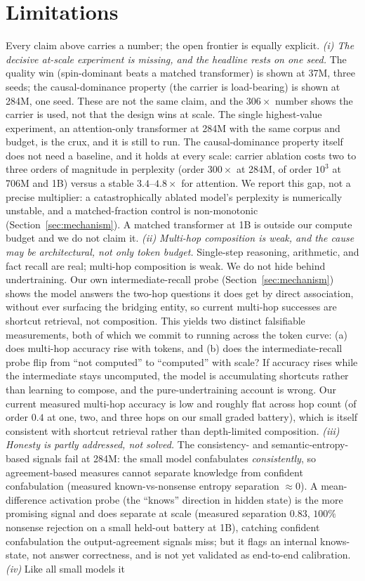 \documentclass[journal]{IEEEtran}
\begin{document}
\section{Limitations}
\label{sec:limitations}
Every claim above carries a number; the open frontier is equally explicit. \emph{(i) The decisive at-scale experiment is missing, and the headline rests on one seed.} The quality win (spin-dominant beats a matched transformer) is shown at 37M, three seeds; the causal-dominance property (the carrier is load-bearing) is shown at 284M, one seed. These are not the same claim, and the $306\times$ number shows the carrier is used, not that the design wins at scale. The single highest-value experiment, an attention-only transformer at 284M with the same corpus and budget, is the crux, and it is still to run. The causal-dominance property itself does not need a baseline, and it holds at every scale: carrier ablation costs two to three orders of magnitude in perplexity (order $300\times$ at 284M, of order $10^3$ at 706M and 1B) versus a stable $3.4$--$4.8\times$ for attention. We report this gap, not a precise multiplier: a catastrophically ablated model's perplexity is numerically unstable, and a matched-fraction control is non-monotonic (Section~\ref{sec:mechanism}). A matched transformer at 1B is outside our compute budget and we do not claim it. \emph{(ii) Multi-hop composition is weak, and the cause may be architectural, not only token budget.} Single-step reasoning, arithmetic, and fact recall are real; multi-hop composition is weak. We do not hide behind undertraining. Our own intermediate-recall probe (Section~\ref{sec:mechanism}) shows the model answers the two-hop questions it does get by direct association, without ever surfacing the bridging entity, so current multi-hop successes are shortcut retrieval, not composition. This yields two distinct falsifiable measurements, both of which we commit to running across the token curve: (a) does multi-hop accuracy rise with tokens, and (b) does the intermediate-recall probe flip from ``not computed'' to ``computed'' with scale? If accuracy rises while the intermediate stays uncomputed, the model is accumulating shortcuts rather than learning to compose, and the pure-undertraining account is wrong. Our current measured multi-hop accuracy is low and roughly flat across hop count (of order $0.4$ at one, two, and three hops on our small graded battery), which is itself consistent with shortcut retrieval rather than depth-limited composition. \emph{(iii) Honesty is partly addressed, not solved.} The consistency- and semantic-entropy-based signals fail at 284M: the small model confabulates \emph{consistently}, so agreement-based measures cannot separate knowledge from confident confabulation (measured known-vs-nonsense entropy separation $\approx 0$). A mean-difference activation probe (the ``knows'' direction in hidden state) is the more promising signal and does separate at scale (measured separation $0.83$, $100\%$ nonsense rejection on a small held-out battery at 1B), catching confident confabulation the output-agreement signals miss; but it flags an internal knows-state, not answer correctness, and is not yet validated as end-to-end calibration. \emph{(iv)} Like all small models it 
\end{document}
